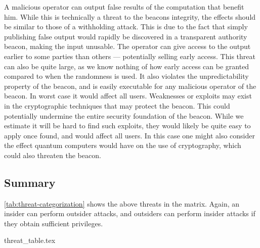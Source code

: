 A malicious operator can output false results of the computation that benefit him. While this is technically a threat to the beacons integrity, the effects should be similar to those of a withholding attack. This is due to the fact that simply publishing false output would rapidly be discovered in a transparent authority beacon, making the input unusable.
 The operator can give access to the output earlier to some parties than others --- potentially selling early access. This threat can also be quite large, as we know nothing of how early access can be granted compared to when the randomness is used. It also violates the unpredictability property of the beacon, and is easily executable for any malicious operator of the beacon. In worst case it would affect all users.
 Weaknesses or exploits may exist in the cryptographic techniques that may protect the beacon. This could potentially undermine the entire security foundation of the beacon. While we estimate it will be hard to find such exploits, they would likely be quite easy to apply once found, and would affect all users. In this case one might also consider the effect quantum computers would have on the use of cryptography, which could also threaten the beacon.

\subsection{Summary}

\cref{tab:threat-categorization} shows the above threats in the matrix. Again, an insider can perform outsider attacks, and outsiders can perform insider attacks if they obtain sufficient privileges.

{threat_table.tex}